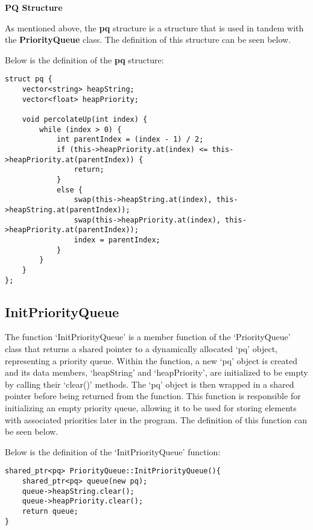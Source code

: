 \textbf{PQ Structure}

As mentioned above, the \textbf{pq} structure is a structure that is used in tandem with the \textbf{PriorityQueue} class. The definition of this structure can be seen below.

\begin{highlight}[PQ Structure]

Below is the definition of the \textbf{pq} structure:

\horizontalline

\begin{verbatim}
struct pq {
    vector<string> heapString;
    vector<float> heapPriority;

    void percolateUp(int index) {
        while (index > 0) {
            int parentIndex = (index - 1) / 2;
            if (this->heapPriority.at(index) <= this->heapPriority.at(parentIndex)) {
                return;
            }
            else {
                swap(this->heapString.at(index), this->heapString.at(parentIndex));
                swap(this->heapPriority.at(index), this->heapPriority.at(parentIndex));
                index = parentIndex;
            }
        }
    }
};
\end{verbatim}
    
\end{highlight}

\subsection*{InitPriorityQueue}

The function `InitPriorityQueue' is a member function of the `PriorityQueue' class that returns a shared pointer to a dynamically allocated `pq' object, representing a priority queue. Within the function, 
a new `pq' object is created and its data members, `heapString' and `heapPriority', are initialized to be empty by calling their `clear()' methods. The `pq' object is then wrapped in a shared pointer before 
being returned from the function. This function is responsible for initializing an empty priority queue, allowing it to be used for storing elements with associated priorities later in the program. The definition
of this function can be seen below.

\begin{highlight}

Below is the definition of the `InitPriorityQueue' function:

\horizontalline

\begin{verbatim}
shared_ptr<pq> PriorityQueue::InitPriorityQueue(){
    shared_ptr<pq> queue(new pq);
    queue->heapString.clear();
    queue->heapPriority.clear();
    return queue;
}
\end{verbatim}

\end{highlight}

